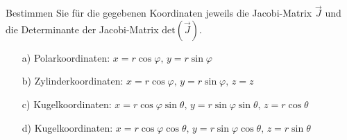 \Aufgabe[e]{}
{
Bestimmen Sie f\"ur die gegebenen Koordinaten jeweils
die Jacobi-Matrix $\vec J$ und die Determinante der Jacobi-Matrix $\text{det}(\vec J)$.

\begin{itemize}
\item[a)] Polarkoordinaten: $x= r \cos \varphi, \, y= r \sin \varphi$ 
\item[b)] Zylinderkoordinaten: $x= r\cos \varphi, \, y= r \sin \varphi, \, z=z $ 
\item[c)] Kugelkoordinaten: $x= r \cos \varphi \sin \theta, \, y= r \sin \varphi \sin \theta, \, z= r \cos \theta$
\item[d)] Kugelkoordinaten: $x= r \cos \varphi \cos \theta, \, y= r \sin \varphi \cos \theta, \, z= r \sin \theta$
\end{itemize}
}
\Loesung{

}

